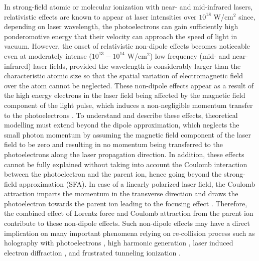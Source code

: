 \documentclass[aps,prl,twocolumn,superscriptaddress,amsmath,amssymb]{revtex4-1}
\begin{document}
In strong-field atomic or molecular ionization with near- and mid-infrared lasers, relativistic effects are known to appear at laser intensities over $10^{18}$ W/cm$^{2}$ \cite{Reiss1998} since, depending on laser wavelength, the photoelectrons can gain sufficiently high ponderomotive energy that their velocity can approach the speed of light in vacuum. However, the onset of relativistic non-dipole effects becomes noticeable even at moderately intense ($10^{13}-10^{14}$ W/cm$^{2}$) low frequency (mid- and near-infrared) laser fields, provided the wavelength is considerably larger than the characteristic atomic size so that the spatial variation of electromagnetic field over the atom cannot be neglected. These non-dipole effects appear as a result of the high energy electrons in the laser field being affected by the magnetic field component of the light pulse, which induces a non-negligible momentum transfer to the photoelectrons \cite{Smeenk2011,Ludwig2014}. To understand and describe these effects, theoretical modelling must extend beyond the dipole approximation, which neglects the small photon momentum by assuming the magnetic field component of the laser field to be zero and resulting in no momentum being transferred to the photoelectrons along the laser propagation direction. In addition, these effects cannot be fully explained without taking into account the Coulomb interaction between the photoelectron and the parent ion, hence going beyond the strong-field approximation (SFA). In case of a linearly polarized laser field, the Coulomb attraction imparts the momentum in the transverse direction and draws the photoelectron towards the parent ion leading to the focusing effect \cite{Rudenko2005,Ivanov2016}. Therefore, the combined effect of Lorentz force and Coulomb attraction from the parent ion contribute to these non-dipole effects. Such non-dipole effects may have a direct implication on many important phenomena relying on re-collision process such as holography with photoelectrons \cite{Huismans2011,Bian2012}, high harmonic generation \cite{Walser2000}, laser induced electron diffraction \cite{Zuo1996,Meckel2008,Blaga2012}, and frustrated tunneling ionization \cite{fti1}.
\end{document}

